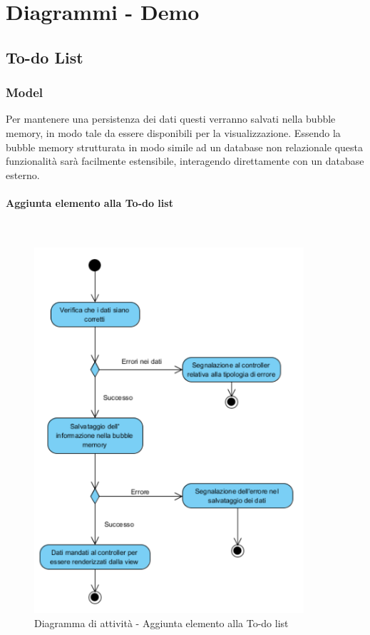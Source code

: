 \section{Diagrammi - Demo}

\subsection{To-do List}

\subsubsection{Model}
Per mantenere una persistenza dei dati questi verranno salvati nella bubble memory, in modo tale da essere disponibili per la visualizzazione. Essendo la bubble memory strutturata in modo simile ad un database non relazionale questa funzionalità sarà facilmente estensibile, interagendo direttamente con un database esterno.

\paragraph{Aggiunta elemento alla To-do list}\mbox{}\\
\nopagebreak
\begin{figure}[H]
	\centering
	\includegraphics[width=10cm]{../../documenti/SpecificaTecnica/diagrammi_img/attivita/addelementtodolist.png}
	\caption{Diagramma di attività - Aggiunta elemento alla To-do list}
\end{figure}


